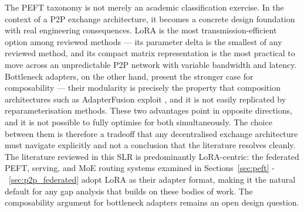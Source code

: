 The PEFT taxonomy is not merely an academic classification \citet{DingNature2023} exercise. In the context of a P2P exchange architecture, it becomes a concrete design foundation with real engineering consequences.
LoRA is the most transmission-efficient option among reviewed methods — its parameter delta is the smallest of any reviewed method, and its compact matrix representation is the most practical to move across an unpredictable P2P network with variable bandwidth and latency. Bottleneck adapters, on the other hand, present the stronger case for composability — their modularity is precisely the property that composition architectures such as AdapterFusion exploit \citep{Han2024}, and it is not easily replicated by reparameterisation methods.
These two advantages point in opposite directions, and it is not possible to fully optimise for both simultaneously. The choice between them is therefore a tradeoff that any decentralised exchange architecture must navigate explicitly and not a conclusion that the literature resolves cleanly. The literature reviewed in this SLR is predominantly LoRA-centric: the federated PEFT, serving, and MoE routing systems examined in Sections~\ref{sec:peft} - ~\ref{sec:p2p_federated} adopt LoRA as their adapter format, making it the natural default for any gap analysis that builds on these bodies of work. The composability argument for bottleneck adapters remains an open design question.




